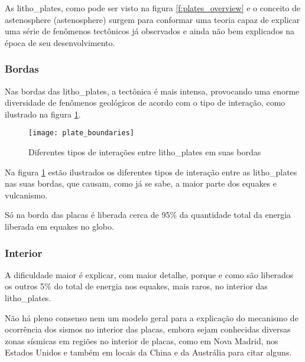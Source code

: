 As \glspl{litho_plate}, como pode ser visto na figura \ref{f:plates_overview} 
e o conceito de \gls{astenosphere} (\glsdesc{astenosphere}) 
surgem para conformar uma teoria capaz de explicar
uma série de fenômenos tectônicos já observados e ainda não bem explicados na época
de seu desenvolvimento. 


\subsubsection{Bordas}
\label{sec:02_bordas}

Nas bordas das \glspl{litho_plate}, a tectônica é mais intensa, 
provocando uma enorme diversidade de fenômenos geológicos de acordo
com o tipo de interação, como ilustrado na figura \ref{f:plate_boundaries}.

\begin{figure}[!h]
   \centering
   \texttt{[image: plate\_boundaries]}
   \caption[Diferentes tipos de interações entre \glspl{litho_plate} em suas bordas]
   		   {Diferentes tipos de interações entre \glspl{litho_plate} em suas bordas\footnotemark} 
   \label{f:plate_boundaries}
\end{figure} 
 
Na figura \ref{f:plate_boundaries} estão ilustrados os diferentes tipos de interação 
entre as \glspl{litho_plate} nas suas bordas, que causam, como já se sabe, a maior
parte dos \glspl{equake} e vulcanismo.

Só na borda das placas é liberada cerca de 95\% da quantidade total da energia 
liberada em \glspl{equake} no globo.


\subsubsection{Interior}
\label{sec:02_interior}

A dificuldade maior é explicar, com maior detalhe, porque e como são liberados os outros 
5\% do total de energia nos \glspl{equake}, mais raros, no interior das \glspl{litho_plate}.

Não há pleno consenso nem um modelo geral para a explicação do mecanismo de ocorrência dos
sismos no interior das placas, embora sejam conhecidas diversas zonas sísmicas em regiões no interior
de placas, como em Nova Madrid, nos Estados Unidos e também em locais da China e da Austrália para citar alguns.


